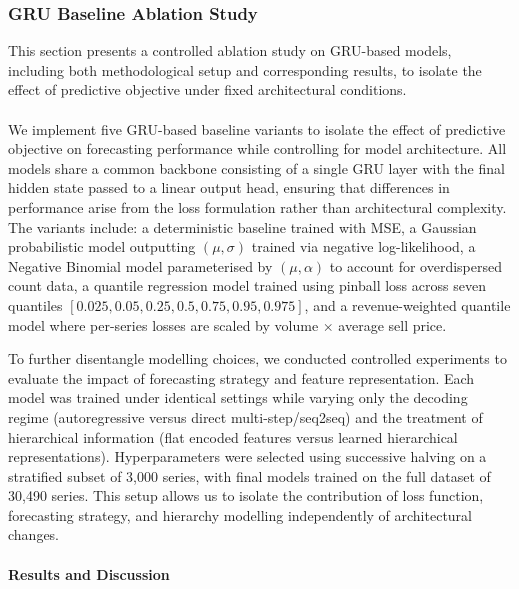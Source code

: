 \subsubsection{GRU Baseline Ablation Study}
This section presents a controlled ablation study on GRU-based models, including both methodological setup and corresponding results, to isolate the effect of predictive objective under fixed architectural conditions.\\\\
We implement five GRU-based baseline variants to isolate the effect of predictive objective on forecasting performance while controlling for model architecture. All models share a common backbone consisting of a single GRU layer with the final hidden state passed to a linear output head, ensuring that differences in performance arise from the loss formulation rather than architectural complexity. The variants include: a deterministic baseline trained with MSE, a Gaussian probabilistic model outputting $(\mu, \sigma)$ trained via negative log-likelihood, a Negative Binomial model parameterised by $(\mu, \alpha)$ to account for overdispersed count data, a quantile regression model trained using pinball loss across seven quantiles $[0.025, 0.05, 0.25, 0.5, 0.75, 0.95, 0.975]$, and a revenue-weighted quantile model where per-series losses are scaled by volume $\times$ average sell price. 

To further disentangle modelling choices, we conducted controlled experiments to evaluate the impact of forecasting strategy and feature representation. Each model was trained under identical settings while varying only the decoding regime (autoregressive versus direct multi-step/seq2seq) and the treatment of hierarchical information (flat encoded features versus learned hierarchical representations). Hyperparameters were selected using successive halving on a stratified subset of 3,000 series, with final models trained on the full dataset of 30,490 series. This setup allows us to isolate the contribution of loss function, forecasting strategy, and hierarchy modelling independently of architectural changes.


\paragraph{Results and Discussion}


